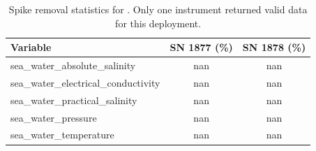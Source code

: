 \begin{table}[h]
\centering
\caption{Spike removal statistics for \projectname{} \casenumber{}. Only one instrument returned valid data for this deployment.}
\label{tab:ntas12_spike_stats}
\begin{tabular}{|l|c|c|}
\hline
Variable & SN 1877 (\%) & SN 1878 (\%) \\
\hline
sea\_water\_absolute\_salinity & nan & nan \\
sea\_water\_electrical\_conductivity & nan & nan \\
sea\_water\_practical\_salinity & nan & nan \\
sea\_water\_pressure & nan & nan \\
sea\_water\_temperature & nan & nan \\
\hline
\end{tabular}
\end{table}
